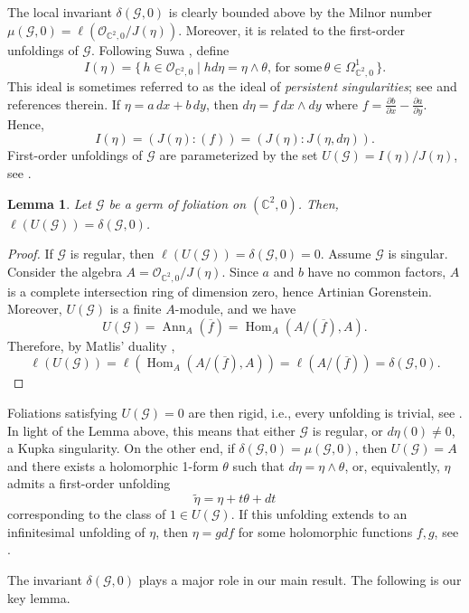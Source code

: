 \documentclass[a4paper, 11pt]{amsart}
\newcommand{\CC}{\mathbb{C}}
\theoremstyle{plain}
\numberwithin{theorem}{section}
\newtheorem{lemma}[theorem]{Lemma}
\theoremstyle{definition}
\DeclareMathOperator{\Hom}{Hom}
\DeclareMathOperator{\ann}{Ann}
\newcommand{\OO}{\mathcal{O}}
\newcommand{\sG}{\mathscr{G}}
\begin{document}
The local invariant $\delta(\sG,0)$ is clearly bounded above by the Milnor number $\mu(\sG,0) = \ell\left({\OO_{\CC^2,0} }/{ J(\eta)} \right)$. Moreover, it is related to the first-order unfoldings of $\sG$. Following Suwa \cite{Suwa-unfoldings}, define 
\[
I(\eta) = \{\, h \in \OO_{\CC^2,0} \mid h d\eta = \eta \wedge \theta, \, \text{for some}\, \theta \in \Omega^1_{\CC^2,0} \,\}.
\]
This ideal is sometimes referred to as the ideal of \emph{persistent singularities}; see \cite{CMQ} and references therein. If $\eta = a\,dx + b\,dy$, then $d\eta = f \,dx\wedge dy$ where $f = \frac{\partial b}{\partial x} -\frac{\partial a}{\partial y}$. Hence,
\[
I(\eta) = (J(\eta) : (f) ) = ( J(\eta) : J(\eta,d\eta)).
\]
First-order unfoldings of $\sG$ are parameterized by the set $U(\sG) = I(\eta)/J(\eta)$, see \cite[\S4]{Suwa-unfoldings}. 

\begin{lemma}\label{lem:unfol-delta}
Let $\sG$ be a germ of foliation on $(\CC^2,0)$. Then, $\ell(U(\sG)) = \delta(\sG,0)$. 
\end{lemma}

\begin{proof}
If $\sG$ is regular, then $\ell(U(\sG)) = \delta(\sG,0) = 0$. Assume $\sG$ is singular. Consider the algebra $A = \OO_{\CC^2,0}/J(\eta)$. Since $a$ and $b$ have no common factors, $A$ is a complete intersection ring of dimension zero, hence Artinian Gorenstein. Moreover, $U(\sG)$ is a finite $A$-module, and we have
\[
U(\sG) = \ann_A(\overline{f}) = \Hom_A(A/(\overline{f}), A).
\]
Therefore, by Matlis' duality \cite[Proposition 3.2.12]{BH}, 
\[
\ell(U(\sG)) = \ell (\Hom_A(A/(\overline{f}), A)) = \ell (A/(\overline{f})) = \delta(\sG,0).
\]
\end{proof}

Foliations satisfying $U(\sG) = 0$ are then rigid, i.e., every unfolding is trivial, see \cite[\S6]{Suwa-unfoldings}. In light of the Lemma above, this means that either $\sG$ is regular, or $d\eta(0) \neq 0$, a Kupka singularity. On the other end, if $\delta(\sG,0) = \mu(\sG,0)$, then $U(\sG) = A$ and there exists a holomorphic 1-form $\theta$  such that $d\eta = \eta \wedge \theta$, or, equivalently, $\eta$ admits a first-order unfolding 
\[
\widetilde \eta  =  \eta + t\theta + dt
\]
corresponding to the class of $1 \in U(\sG)$. If this unfolding extends to an infinitesimal unfolding of $\eta$, then $\eta = gdf$ for some holomorphic functions $f,g$, see \cite[Proposition 6.14]{Suwa2}. 


The invariant $\delta(\sG,0)$ plays a major role in our main result. The following is our key lemma.  
\end{document}
